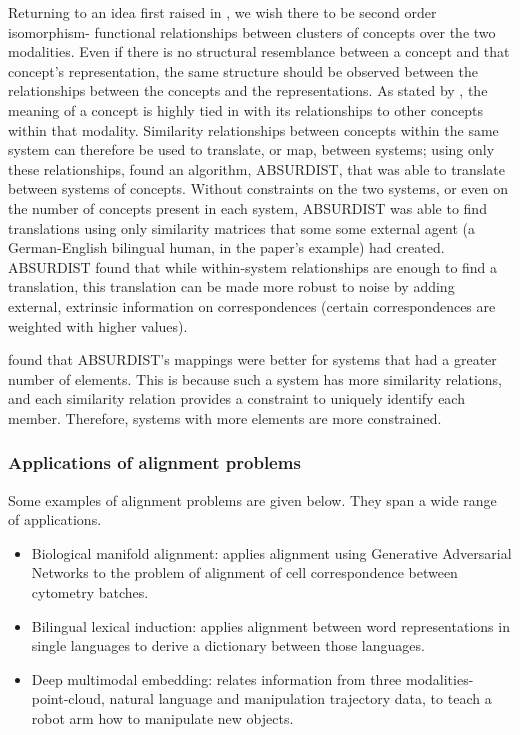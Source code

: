 Returning to an idea first raised in \cite{SHEPARD19701}, we wish there to be second order isomorphism- functional relationships between clusters of concepts over the two modalities. Even if there is no structural resemblance between a concept and that concept's representation, the same structure should be observed between the relationships between the concepts  and the representations. As stated by \cite{GOLDSTONE2002295}, the meaning of a concept is highly tied in with its relationships to other concepts within that modality. Similarity relationships between concepts within the same system can therefore be used to translate, or map, between systems; using only these relationships, \cite{GOLDSTONE2002295} found an algorithm, ABSURDIST, that was able to translate between systems of concepts. Without constraints on the two systems, or even on the number of concepts present in each system, ABSURDIST was able to find translations using only similarity matrices that some some external agent (a German-English bilingual human, in the paper's example) had created. ABSURDIST found that while within-system relationships are enough to find a translation, this translation can be made more robust to noise by adding external, extrinsic information on correspondences (certain correspondences are weighted with higher values). 

\cite{GOLDSTONE2002295} found that ABSURDIST's mappings were better for systems that had a greater number of elements. This is because such a system has more similarity relations, and each similarity relation provides a constraint to uniquely identify each member. Therefore, systems with more elements are more constrained. 


\subsubsection{Applications of alignment problems}

Some examples of alignment problems are given below. They span a wide range of applications. 

\begin{itemize}
    \item Biological manifold alignment: \cite{magan} applies alignment using Generative Adversarial Networks \cite{GAN} to the problem of alignment of cell correspondence between cytometry batches.
    \item Bilingual lexical induction: \cite{wordtranslationwithoutparalleldata} applies alignment between word representations in single languages to derive a dictionary between those languages.
    \item Deep multimodal embedding: \cite{DeepMultimodalEmbedding} relates information from three modalities- point-cloud, natural language and manipulation trajectory data, to teach a robot arm  how to manipulate new objects. 
\end{itemize}

